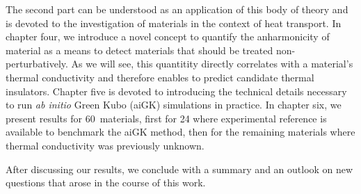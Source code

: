 The second part can be understood as an application of this body of theory and is devoted to the investigation of materials in the context of heat transport. In chapter four, we introduce a novel concept to quantify the anharmonicity of material as a means to detect materials that should be treated non-perturbatively. As we will see, this quantitity directly correlates with a material's thermal conductivity and therefore enables to predict candidate thermal insulators. Chapter five is devoted to introducing the technical details necessary to run \emph{ab initio} Green Kubo (aiGK) simulations in practice. In chapter six, we present results for 60~materials, first for 24 where experimental reference is available to benchmark the aiGK method, then for the remaining materials where thermal conductivity was previously unknown. 

After discussing our results, we conclude with a summary and an outlook on new questions that arose in the course of this work.
  